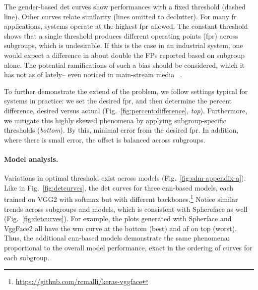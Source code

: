 
The gender-based \gls{det} curves show performances with a fixed threshold (dashed line). Other curves relate similarity (lines omitted to declutter). For many \gls{fr} applications, systems operate at the highest \gls{fpr} allowed. The constant threshold shows that a single threshold produces different operating points (\ie \gls{fpr}) across subgroups, which is undesirable. %
If this is the case in an industrial system, one would expect a difference in about double the FPs reported based on subgroup alone. The potential ramifications of such a bias should be considered, which it has not as of lately-- even noticed in main-stream media ~\cite{england2019,snow2018}.

To further demonstrate the extend of the problem, we follow settings typical for systems in practice: we set the desired \gls{fpr}, and then determine the percent difference, \ie desired versus actual (Fig.~\ref{fig:percent:difference}, \emph{top}). Furthermore, we mitigate this highly skewed phenomena by applying subgroup-specific thresholds (\emph{bottom}). By this, minimal error from the desired \gls{fpr}. In addition, where there is small error, the offset is balanced across subgroups.

\noindent\paragraph{Model analysis.}
Variations in optimal threshold exist across models (Fig.~\ref{fig:sdm-appendix-a}). Like in Fig.~\ref{fig:detcurves}, the \gls{det} curves for three \gls{cnn}-based models, each trained on VGG2 with softmax but with different backbones.\footnote{\href{https://github.com/rcmalli/keras-vggface}{https://github.com/rcmalli/keras-vggface}} Notice similar trends across subgroups and models, which is consistent with  Sphereface as well (Fig.~\ref{fig:detcurves}). For example, the plots generated with Spherface and VggFace2 all have the \gls{wm} curve at the bottom (\ie best) and \gls{af} on top (\ie worst). Thus, the additional \gls{cnn}-based models demonstrate the same phenomena: proportional to the overall model performance, exact in the ordering of curves for each subgroup.

